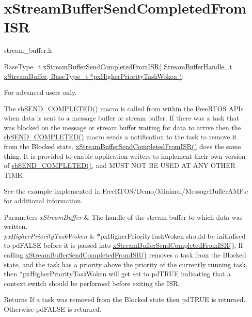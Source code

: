 \hypertarget{group__xStreamBufferSendCompletedFromISR}{}\section{x\+Stream\+Buffer\+Send\+Completed\+From\+I\+SR}
\label{group__xStreamBufferSendCompletedFromISR}
stream\+\_\+buffer.\+h


\begin{DoxyPre}
BaseType\_t \hyperlink{stream__buffer_8h_abc37189e4eb8618f5434ae333dd50b23}{xStreamBufferSendCompletedFromISR( StreamBufferHandle\_t xStreamBuffer, BaseType\_t *pxHigherPriorityTaskWoken )};
\end{DoxyPre}


For advanced users only.

The \hyperlink{stream__buffer_8c_aa75273dfbcd92710254df0165ae1da5d}{sb\+S\+E\+N\+D\+\_\+\+C\+O\+M\+P\+L\+E\+T\+E\+D()} macro is called from within the Free\+R\+T\+OS A\+P\+Is when data is sent to a message buffer or stream buffer. If there was a task that was blocked on the message or stream buffer waiting for data to arrive then the \hyperlink{stream__buffer_8c_aa75273dfbcd92710254df0165ae1da5d}{sb\+S\+E\+N\+D\+\_\+\+C\+O\+M\+P\+L\+E\+T\+E\+D()} macro sends a notification to the task to remove it from the Blocked state. \hyperlink{stream__buffer_8h_abc37189e4eb8618f5434ae333dd50b23}{x\+Stream\+Buffer\+Send\+Completed\+From\+I\+S\+R()} does the same thing. It is provided to enable application writers to implement their own version of \hyperlink{stream__buffer_8c_aa75273dfbcd92710254df0165ae1da5d}{sb\+S\+E\+N\+D\+\_\+\+C\+O\+M\+P\+L\+E\+T\+E\+D()}, and M\+U\+ST N\+OT BE U\+S\+ED AT A\+NY O\+T\+H\+ER T\+I\+ME.

See the example implemented in Free\+R\+T\+O\+S/\+Demo/\+Minimal/\+Message\+Buffer\+A\+M\+P.\+c for additional information.


\begin{DoxyParams}{Parameters}
{\em x\+Stream\+Buffer} & The handle of the stream buffer to which data was written.\\
\hline
{\em px\+Higher\+Priority\+Task\+Woken} & $\ast$px\+Higher\+Priority\+Task\+Woken should be initialised to pd\+F\+A\+L\+SE before it is passed into \hyperlink{stream__buffer_8h_abc37189e4eb8618f5434ae333dd50b23}{x\+Stream\+Buffer\+Send\+Completed\+From\+I\+S\+R()}. If calling \hyperlink{stream__buffer_8h_abc37189e4eb8618f5434ae333dd50b23}{x\+Stream\+Buffer\+Send\+Completed\+From\+I\+S\+R()} removes a task from the Blocked state, and the task has a priority above the priority of the currently running task, then $\ast$px\+Higher\+Priority\+Task\+Woken will get set to pd\+T\+R\+UE indicating that a context switch should be performed before exiting the I\+SR.\\
\hline
\end{DoxyParams}
\begin{DoxyReturn}{Returns}
If a task was removed from the Blocked state then pd\+T\+R\+UE is returned. Otherwise pd\+F\+A\+L\+SE is returned. 
\end{DoxyReturn}
